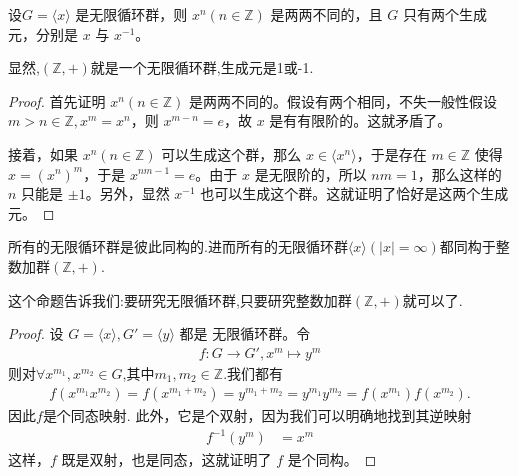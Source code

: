 \documentclass[../../main.tex]{subfiles}
\begin{document}
\begin{proposition}\label{proposition:每一个无限循环群都对应两个生成元}
设$G = \langle x\rangle$ 是无限循环群，则 $x^n(n\in\mathbb{Z})$ 是两两不同的，且 $G$ 只有两个生成元，分别是 $x$ 与 $x^{-1}$。
\end{proposition}
\begin{note}
显然,$(\mathbb{Z},+)$就是一个无限循环群,生成元是1或-1.
\end{note}
\begin{proof}
首先证明 $x^n(n\in\mathbb{Z})$ 是两两不同的。假设有两个相同，不失一般性假设 $m > n\in\mathbb{Z},x^m = x^n$，则 $x^{m - n}=e$，故 $x$ 是有有限阶的。这就矛盾了。

接着，如果 $x^n(n\in\mathbb{Z})$ 可以生成这个群，那么 $x\in\langle x^n\rangle$，于是存在 $m\in\mathbb{Z}$ 使得 $x=(x^n)^m$，于是 $x^{nm - 1}=e$。由于 $x$ 是无限阶的，所以 $nm = 1$，那么这样的 $n$ 只能是 $\pm1$。另外，显然 $x^{-1}$ 也可以生成这个群。这就证明了恰好是这两个生成元。
\end{proof}

\begin{proposition}\label{proposition:所有的无限循环群是彼此同构的}
所有的无限循环群是彼此同构的.进而所有的无限循环群$\langle x\rangle(|x|=\infty)$都同构于整数加群$(\mathbb{Z},+)$.
\end{proposition}
\begin{note}
这个命题告诉我们:要研究无限循环群,只要研究整数加群$(\mathbb{Z},+)$就可以了.
\end{note}
\begin{proof}
设 $G = \langle x\rangle, G' = \langle y\rangle$ 都是 无限循环群。令
\begin{align*}
f:G\rightarrow G'
,
x^m\mapsto y^m
\end{align*}
则对$\forall x^{m_1},x^{m_2}\in G$,其中$m_1,m_2\in \mathbb{Z}$.我们都有
\begin{align*}
f\left( x^{m_1}x^{m_2} \right) =f\left( x^{m_1+m_2} \right) =y^{m_1+m_2}=y^{m_1}y^{m_2}=f\left( x^{m_1} \right) f\left( x^{m_2} \right) .
\end{align*}
因此$f$是个同态映射.
此外，它是个双射，因为我们可以明确地找到其逆映射
\begin{align*}
f^{-1}(y^m)&=x^m
\end{align*}
这样，$f$ 既是双射，也是同态，这就证明了 $f$ 是个同构。
\end{proof}
\end{document}
